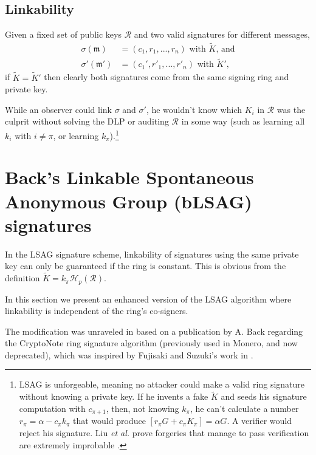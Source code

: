 \subsection*{Linkability}

Given a fixed set of public keys \(\mathcal{R}\) and two valid signatures for different messages, \vspace{.1cm}
\begin{align*}
\sigma(\mathfrak{m})   &= (c_1, r_1, ..., r_n)\textrm{ with } \tilde{K}\textrm{, and}\\
\sigma'(\mathfrak{m}')  &= (c_1', r'_1, ..., r'_n)\textrm{ with } \tilde{K}'\textrm{,}
\end{align*}
\quad if \(\tilde{K} =  \tilde{K}'\) then clearly both signatures come from the same signing ring and private key.%

While an observer could link $\sigma$ and $\sigma'$, he wouldn’t know which $K_i$ in $\mathcal{R}$ was the culprit without solving the DLP or auditing $\mathcal{R}$ in some way (such as learning all $k_i$ with $i \neq \pi$, or learning $k_\pi$).\footnote{\label{lsag_unforgeable_note}LSAG is unforgeable, meaning no attacker could make a valid ring signature without knowing a private key. If he invents a fake $\tilde{K}$ and seeds his signature computation with $c_{\pi+1}$, then, not knowing $k_\pi$, he can’t calculate a number $r_\pi = \alpha - c_\pi k_\pi$ that would produce $[r_\pi G + c_\pi K_\pi] = \alpha G$. A verifier would reject his signature. Liu {\em et al.} prove forgeries that manage to pass verification are extremely improbable \cite{Liu2004}.}



\section{Back's Linkable Spontaneous Anonymous Group (bLSAG) signatures}
\label{blsag_note}

In the LSAG signature scheme, linkability of signatures using the same private key can only be guaranteed if the ring is constant. This is obvious from the definition \(\tilde{K} = k_\pi \mathcal{H}_p(\mathcal{R})\).

In this section we present an enhanced version of the LSAG algorithm where linkability is independent of the ring’s co-signers.

The modification was unraveled in \cite{MRL-0005} based on a publication by A. Back \cite{AdamBack-ring-efficiency} regarding the CryptoNote \cite{cryptoNoteWhitePaper} ring signature algorithm (previously used in Monero, and now deprecated), which was inspired by Fujisaki and Suzuki's work in \cite{Fujisaki2007}.


